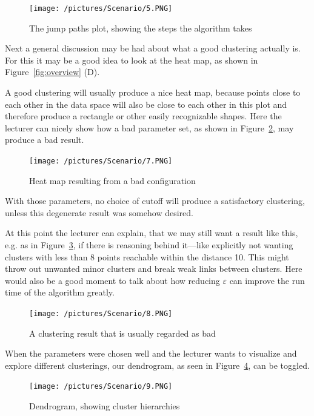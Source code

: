 \documentclass{vgtc} %
\begin{document}
\begin{figure}[tb]
    \centering
    \texttt{[image: /pictures/Scenario/5.PNG]}
    \caption{The jump paths plot, showing the steps the algorithm takes}
    \label{fig:jump-paths}
\end{figure}

Next a general discussion may be had about what a good clustering actually is.
For this it may be a good idea to look at the heat map, as shown in
Figure~\ref{fig:overview} (D).

A good clustering will usually produce a nice heat map, because points close to
each other in the data space will also be close to each other in this plot and
therefore produce a rectangle or other easily recognizable shapes. Here the
lecturer can nicely show how a bad parameter set, as shown in
Figure~\ref{fig:heatmap-bad}, may produce a bad result.

\begin{figure}[tb]
    \centering
    \texttt{[image: /pictures/Scenario/7.PNG]}
    \caption{Heat map resulting from a bad configuration}
    \label{fig:heatmap-bad}
\end{figure}

With those parameters, no choice of cutoff will produce a satisfactory
clustering, unless this degenerate result was somehow desired.

At this point the lecturer can explain, that we may still want a result like this, e.g.
as in Figure~\ref{fig:bad-param-set}, if there is reasoning behind it---like
explicitly not wanting clusters with less than 8 points reachable within the
distance 10. This might throw out unwanted minor clusters and break weak links
between clusters. Here would also be a good moment to talk about how reducing
$\varepsilon$ can improve the run time of the algorithm greatly.

\begin{figure}[tb]
    \centering
    \texttt{[image: /pictures/Scenario/8.PNG]}
    \caption{A clustering result that is usually regarded as bad}
    \label{fig:bad-param-set}
\end{figure}

When the parameters were chosen well and the lecturer wants to visualize and
explore different clusterings, our dendrogram, as seen in
Figure~\ref{fig:dendogram}, can be toggled.

\begin{figure}[tb]
    \centering
    \texttt{[image: /pictures/Scenario/9.PNG]}
    \caption{Dendrogram, showing cluster hierarchies}
    \label{fig:dendogram}
\end{figure}
\end{document}
